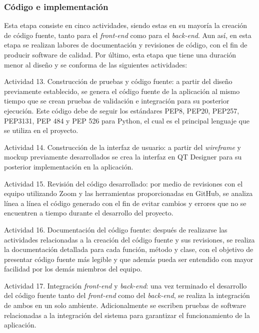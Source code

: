\subsubsection{Código e implementación}
Esta etapa consiste en cinco actividades, siendo estas en su mayoría la creación de código fuente, tanto para el \textit{front-end} como para el \textit{back-end}. Aun así, en esta etapa se realizan labores de documentación y revisiones de código, con el fin de producir software de calidad. Por último, esta etapa que tiene una duración menor al diseño y se conforma de las siguientes actividades:

\begin{APAitemize}
    \item Actividad 13. Construcción de pruebas y código fuente: a partir del diseño previamente establecido, se genera el código fuente de la aplicación al mismo tiempo que se crean pruebas de validación e integración para su posterior ejecución. Este código debe de seguir los estándares PEP8, PEP20, PEP257, PEP3131, PEP 484 y PEP 526 para Python, el cual es el principal lenguaje que se utiliza en el proyecto.
    \item Actividad 14. Construcción de la interfaz de usuario: a partir del \textit{wireframe} y mockup previamente desarrollados se crea la interfaz en QT Designer para su posterior implementación en la aplicación.
    \item Actividad 15. Revisión del código desarrollado: por medio de revisiones con el equipo utilizando Zoom y las herramientas proporcionadas en GitHub, se analiza línea a línea el código generado con el fin de evitar cambios y errores que no se encuentren a tiempo durante el desarrollo del proyecto.
    \item Actividad 16. Documentación del código fuente: después de realizarse las actividades relacionadas a la creación del código fuente y sus revisiones, se realiza la documentación detallada para cada función, método y clase, con el objetivo de presentar código fuente más legible y que además pueda ser entendido con mayor facilidad por los demás miembros del equipo.
    \item Actividad 17. Integración \textit{front-end} y \textit{back-end}: una vez terminado el desarrollo del código fuente tanto del \textit{front-end} como del \textit{back-end}, se realiza la integración de ambos en un solo ambiente. Adicionalmente se escriben pruebas de software relacionadas a la integración del sistema para garantizar el funcionamiento de la aplicación.
\end{APAitemize}

